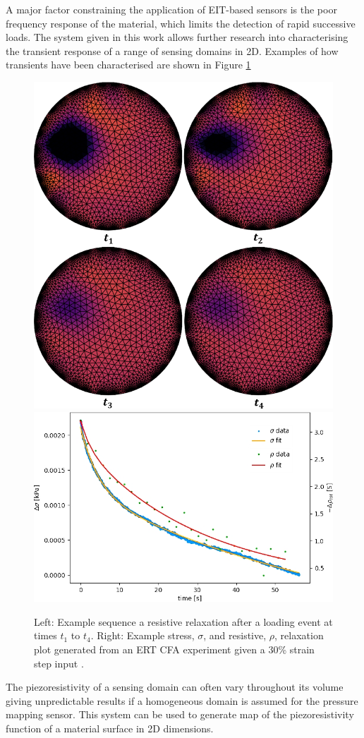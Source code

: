 A major factor constraining the application of EIT-based sensors is the poor frequency response of the material, which limits the detection of rapid successive loads. The system given in this work allows further research into characterising the transient response of a range of sensing domains in 2D. Examples of how transients have been characterised are shown in Figure \ref{fig:2D-transient}
\begin{figure}[H]
\centering
\includegraphics[width=0.3\linewidth]{Figures/res_relax_DEA_EIT_1mm_3load_7kV_1.png}
\hspace{1cm}
\includegraphics[width=0.5\linewidth]{Figures/2D Push event 0 - CBSR 9 wt 30p strain - 2D compressionv2.jpg}
\caption{Left: Example sequence a resistive relaxation after a loading event at times $t_1$ to $t_4$. Right: Example stress, $\sigma$, and resistive, $\rho$, relaxation plot generated from an ERT CFA experiment given a 30\% strain step input \cite{Ellingham2024}.}
\label{fig:2D-transient}
\end{figure}

The piezoresistivity of a sensing domain can often vary throughout its volume giving unpredictable results if a homogeneous domain is assumed for the pressure mapping sensor. This system can be used to generate map of the piezoresistivity function of a material surface in 2D dimensions.


